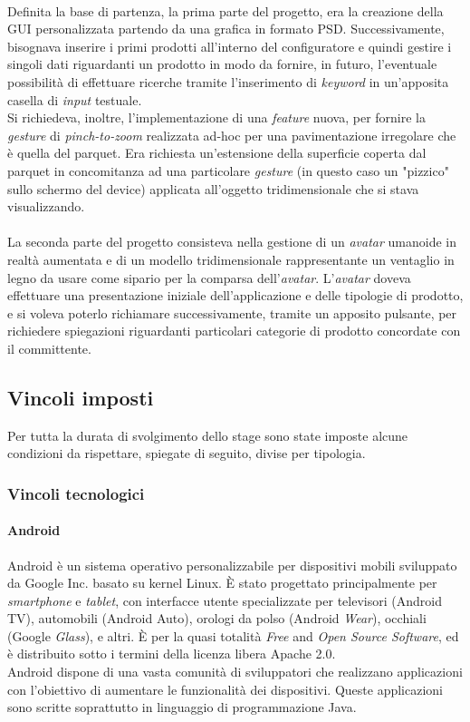 \\
Definita la base di partenza, la prima parte del progetto, era la creazione della GUI personalizzata partendo da una grafica in formato PSD. Successivamente, bisognava inserire i primi prodotti all'interno del configuratore e quindi gestire i singoli dati riguardanti un prodotto in modo da fornire, in futuro, l'eventuale possibilit\`a di effettuare ricerche tramite l'inserimento di \textit{keyword} in un'apposita casella di \textit{input} testuale.
\\
Si richiedeva, inoltre, l'implementazione di una \textit{feature} nuova, per fornire la \textit{gesture} di \textit{pinch-to-zoom} realizzata ad-hoc per una pavimentazione irregolare che \`e quella del parquet. Era richiesta un'estensione della superficie coperta dal parquet in concomitanza ad una particolare \textit{gesture} (in questo caso un "pizzico" sullo schermo del device) applicata all'oggetto tridimensionale che si stava visualizzando.
\\
\\
La seconda parte del progetto consisteva nella gestione di un \textit{avatar\gloss} umanoide in realt\`a aumentata e di un modello tridimensionale rappresentante un ventaglio in legno da usare come sipario per la comparsa dell'\textit{avatar\gloss}. L'\textit{avatar\gloss} doveva effettuare una presentazione iniziale dell'applicazione e delle tipologie di prodotto, e si voleva poterlo richiamare successivamente, tramite un apposito pulsante, per richiedere spiegazioni riguardanti particolari categorie di prodotto concordate con il committente.

\subsection{Vincoli imposti}
Per tutta la durata di svolgimento dello stage sono state imposte alcune condizioni da rispettare, spiegate di seguito, divise per tipologia.

\subsubsection{Vincoli tecnologici}
\paragraph{Android}
Android è un sistema operativo personalizzabile per dispositivi mobili sviluppato da Google Inc. basato su kernel Linux.
È stato progettato principalmente per \textit{smartphone} e \textit{tablet}, con interfacce utente specializzate per televisori (Android TV), automobili (Android Auto), orologi da polso (Android \textit{Wear}), occhiali (Google \textit{Glass}), e altri.
È per la quasi totalità \textit{Free} and \textit{Open Source Software}, ed è distribuito sotto i termini della licenza libera Apache 2.0.\\
Android dispone di una vasta comunità di sviluppatori che realizzano applicazioni con l'obiettivo di aumentare le funzionalità dei dispositivi. Queste applicazioni sono scritte soprattutto in linguaggio di programmazione Java.
\\

